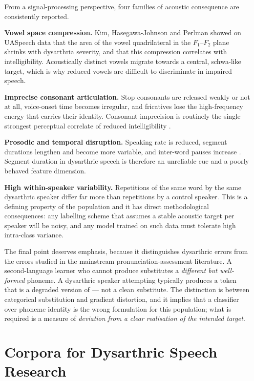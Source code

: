 From a signal-processing perspective, four families of acoustic consequence are
consistently reported.

\textbf{Vowel space compression.} Kim, Hasegawa-Johnson and Perlman
\cite{kim2011vowel} showed on UASpeech data that the area of the vowel
quadrilateral in the $F_1$--$F_2$ plane shrinks with dysarthria severity, and
that this compression correlates with intelligibility. Acoustically distinct
vowels migrate towards a central, schwa-like target, which is why reduced
vowels are difficult to discriminate in impaired speech.

\textbf{Imprecise consonant articulation.} Stop consonants are released weakly
or not at all, voice-onset time becomes irregular, and fricatives lose the
high-frequency energy that carries their identity. Consonant imprecision is
routinely the single strongest perceptual correlate of reduced intelligibility
\cite{ansel1992acoustic}.

\textbf{Prosodic and temporal disruption.} Speaking rate is reduced, segment
durations lengthen and become more variable, and inter-word pauses increase
\cite{tjaden2003characteristics}. Segment duration in dysarthric speech is
therefore an unreliable cue and a poorly behaved feature dimension.

\textbf{High within-speaker variability.} Repetitions of the same word by the
same dysarthric speaker differ far more than repetitions by a control speaker.
This is a defining property of the population and it has direct methodological
consequences: any labelling scheme that assumes a stable acoustic target per
speaker will be noisy, and any model trained on such data must tolerate high
intra-class variance.

The final point deserves emphasis, because it distinguishes dysarthric errors
from the errors studied in the mainstream pronunciation-assessment literature.
A second-language learner who cannot produce  substitutes a
\emph{different but well-formed} phoneme. A dysarthric speaker attempting
 typically produces a token that is a degraded version of  --- not
a clean substitute. The distinction is between categorical substitution and
gradient distortion, and it implies that a classifier over phoneme identity is
the wrong formulation for this population; what is required is a measure of
\emph{deviation from a clear realisation of the intended target}.

\section{Corpora for Dysarthric Speech Research}
\label{sec:lit-corpora}

